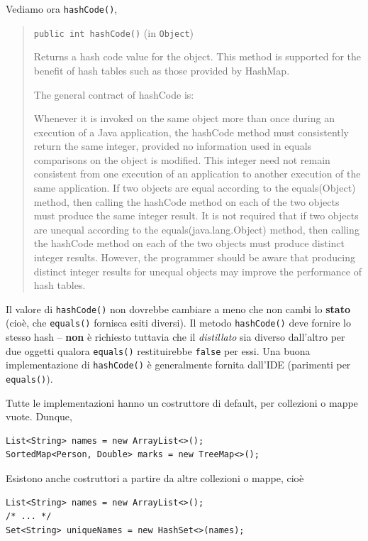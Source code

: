 \documentclass[\fontsizeclass,twocolumn]{\classname}
\let\oldtextsc\textsc
\renewcommand{\textsc}[1]{\oldtextsc{\scfontfs #1}}
\theoremstyle{definition}
\theoremstyle{definition}
\begin{document}
Vediamo ora \texttt{hashCode()},
\begin{quote}
    \footnotesize{\texttt{public int hashCode()} (in \texttt{Object})

Returns a hash code value for the object. This method is supported for the benefit of hash tables such as those provided by HashMap.

The general contract of hashCode is:

    Whenever it is invoked on the same object more than once during an execution of a Java application, the hashCode method must consistently return the same integer, provided no information used in equals comparisons on the object is modified. This integer need not remain consistent from one execution of an application to another execution of the same application.
    If two objects are equal according to the equals(Object) method, then calling the hashCode method on each of the two objects must produce the same integer result.
    It is not required that if two objects are unequal according to the equals(java.lang.Object) method, then calling the hashCode method on each of the two objects must produce distinct integer results. However, the programmer should be aware that producing distinct integer results for unequal objects may improve the performance of hash tables.
}
\end{quote}

Il valore di \texttt{hashCode()} non dovrebbe cambiare a meno che non cambi lo
\textbf{stato} (cioè, che \texttt{equals()} fornisca esiti diversi). Il metodo
\texttt{hashCode()} deve fornire lo stesso hash -- \textbf{non} è richiesto
tuttavia che il \emph{distillato} sia diverso dall'altro per due oggetti
qualora \texttt{equals()} restituirebbe \texttt{false} per essi. Una buona
implementazione di \texttt{hashCode()} è generalmente fornita dall'\textsc{IDE}
(parimenti per \texttt{equals()}).

Tutte le implementazioni hanno un costruttore di default, per collezioni o
mappe vuote. Dunque,

\begin{lstlisting}
List<String> names = new ArrayList<>();
SortedMap<Person, Double> marks = new TreeMap<>();
\end{lstlisting}

Esistono anche costruttori a partire da altre collezioni o mappe, cioè

\begin{lstlisting}
List<String> names = new ArrayList<>();
/* ... */
Set<String> uniqueNames = new HashSet<>(names);
\end{lstlisting}
\end{document}

